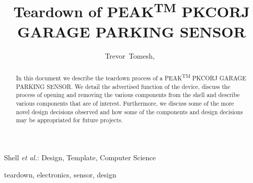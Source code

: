 \documentclass[journal]{IEEEtran}
\begin{document}

\title{Teardown of PEAK\textsuperscript{TM} PKCORJ GARAGE PARKING SENSOR}


\author{Trevor~Tomesh,~
        }


%
{Shell \MakeLowercase{\textit{et al.}}: Design, Template, Computer Science }


\maketitle

\begin{abstract}
In this document we describe the teardown process of a PEAK\textsuperscript{TM} PKCORJ GARAGE PARKING SENSOR. 
We detail the advertised function of the device, discuss the process of opening and removing the various 
components from the shell and describe various components that are of interest. Furthermore, we discuss some
of the more novel design decisions observed and how some of the components and design decisions may be appropriated
for future projects. 


\end{abstract}

\begin{IEEEkeywords}
teardown, electronics, sensor, design
\end{IEEEkeywords}

%
\end{document}

